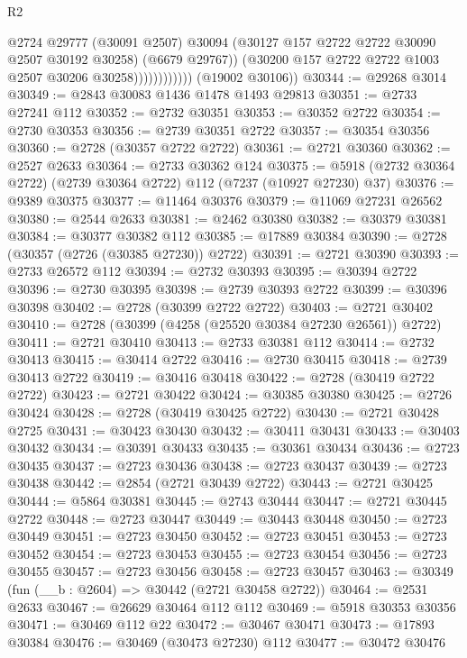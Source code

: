 \begin{lexlean}{R2}
\begin{coremodule}
                              @2724
                              @29777
                              (@30091 @2507)
                              @30094
                              (@30127 @157 @2722 @2722 @30090 @2507 @30192 @30258)
                              (@6679 @29767))
                            (@30200 @157 @2722 @2722 @1003 @2507 @30206 @30258))))))))))))
      (@19002 @30106))
@30344 := @29268 @3014
@30349 := @2843 @30083 @1436 @1478 @1493 @29813
@30351 := @2733 @27241 @112
@30352 := @2732 @30351
@30353 := @30352 @2722
@30354 := @2730 @30353
@30356 := @2739 @30351 @2722
@30357 := @30354 @30356
@30360 := @2728 (@30357 @2722 @2722)
@30361 := @2721 @30360
@30362 := @2527 @2633
@30364 := @2733 @30362 @124
@30375 := @5918 (@2732 @30364 @2722) (@2739 @30364 @2722) @112 (@7237 (@10927 @27230) @37)
@30376 := @9389 @30375
@30377 := @11464 @30376
@30379 := @11069 @27231 @26562
@30380 := @2544 @2633
@30381 := @2462 @30380
@30382 := @30379 @30381
@30384 := @30377 @30382 @112
@30385 := @17889 @30384
@30390 := @2728 (@30357 (@2726 (@30385 @27230)) @2722)
@30391 := @2721 @30390
@30393 := @2733 @26572 @112
@30394 := @2732 @30393
@30395 := @30394 @2722
@30396 := @2730 @30395
@30398 := @2739 @30393 @2722
@30399 := @30396 @30398
@30402 := @2728 (@30399 @2722 @2722)
@30403 := @2721 @30402
@30410 := @2728 (@30399 (@4258 (@25520 @30384 @27230 @26561)) @2722)
@30411 := @2721 @30410
@30413 := @2733 @30381 @112
@30414 := @2732 @30413
@30415 := @30414 @2722
@30416 := @2730 @30415
@30418 := @2739 @30413 @2722
@30419 := @30416 @30418
@30422 := @2728 (@30419 @2722 @2722)
@30423 := @2721 @30422
@30424 := @30385 @30380
@30425 := @2726 @30424
@30428 := @2728 (@30419 @30425 @2722)
@30430 := @2721 @30428 @2725
@30431 := @30423 @30430
@30432 := @30411 @30431
@30433 := @30403 @30432
@30434 := @30391 @30433
@30435 := @30361 @30434
@30436 := @2723 @30435
@30437 := @2723 @30436
@30438 := @2723 @30437
@30439 := @2723 @30438
@30442 := @2854 (@2721 @30439 @2722)
@30443 := @2721 @30425
@30444 := @5864 @30381
@30445 := @2743 @30444
@30447 := @2721 @30445 @2722
@30448 := @2723 @30447
@30449 := @30443 @30448
@30450 := @2723 @30449
@30451 := @2723 @30450
@30452 := @2723 @30451
@30453 := @2723 @30452
@30454 := @2723 @30453
@30455 := @2723 @30454
@30456 := @2723 @30455
@30457 := @2723 @30456
@30458 := @2723 @30457
@30463 := @30349 (fun (__b : @2604) => @30442 (@2721 @30458 @2722))
@30464 := @2531 @2633
@30467 := @26629 @30464 @112 @112
@30469 := @5918 @30353 @30356
@30471 := @30469 @112 @22
@30472 := @30467 @30471
@30473 := @17893 @30384
@30476 := @30469 (@30473 @27230) @112
@30477 := @30472 @30476

\end{coremodule}
\end{lexlean}
